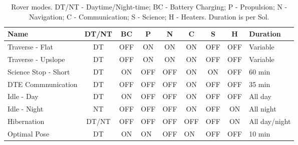 \begin{table}[h]
\footnotesize
\centering
\caption[Rover modes]
    {Rover modes. DT/NT - Daytime/Night-time; BC - Battery Charging; P - Propulsion; N - Navigation; C - Communication; S - Science; H - Heaters. Duration is per Sol.}
\label{tab:rover-modes}
\begin{tabular}{|l|c|c|c|c|c|c|c|l|}
\hline
\textbf{Name} & \textbf{DT/NT} & \textbf{BC} & \textbf{P} & \textbf{N} & \textbf{C} & \textbf{S} & \textbf{H} & \textbf{Duration} \\ \hline
Traverse - Flat & DT & OFF & ON & ON & ON & OFF & OFF & Variable \\ \hline
Traverse - Upslope & DT & OFF & ON & ON & ON & OFF & OFF & Variable \\ \hline
Science Stop - Short & DT & ON & OFF & OFF & ON & ON & OFF & 60 min \\ \hline
\ac{DTE} Commnunication & DT & OFF & OFF & OFF & ON & OFF & OFF & 35 min \\ \hline
Idle - Day & DT & ON & OFF & OFF & ON & OFF & OFF & All day \\ \hline
Idle - Night & NT & OFF & OFF & OFF & ON & OFF & ON & All night \\ \hline
Hibernation & DT/NT & OFF & OFF & OFF & OFF & OFF & ON & All day/night \\ \hline
Optimal Pose & DT & ON & \multicolumn{1}{l|}{ON} & \multicolumn{1}{l|}{OFF} & \multicolumn{1}{l|}{ON} & \multicolumn{1}{l|}{OFF} & \multicolumn{1}{l|}{OFF} & 10 min \\ \hline
\end{tabular}
\end{table}
